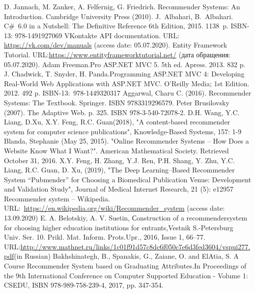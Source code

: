 \documentclass[conference]{IEEEtran}
\begin{document}
\begin{thebibliography}{99}
 D. Jannach, M. Zanker, A. Felfernig, G. Friedrich. Recommender Systems: An Introduction. Cambridge University Press (2010).
 J.~Albahari, B.~Albahari. C\#~6.0 in a Nutshell: The Definitive Reference 6th Edition, 2015. 1138~p. ISBN-13: 978-1491927069
VKontakte API documentation. URL: \url{https://vk.com/dev/manuals} (access date: 05.07.2020).
Entity Framework Tutorial. URL:\url{https://www.entityframeworktutorial.net/} (дата обращения: 05.07.2020).
Adam Freeman.Pro ASP.NET MVC 5. 5th ed. Apress. 2013. 832 p. 
 J. Chadwick, T. Snyder, H. Panda.Programming ASP.NET MVC 4: Developing Real-World Web Applications with ASP.NET MVC.  O'Reilly Media; 1st Edition. 2012. 492 p.  ISBN-13:~978-1449320317
Aggarwal, Charu C. (2016). Recommender Systems: The Textbook. Springer. ISBN 9783319296579.
Peter Brusilovsky (2007). The Adaptive Web. p. 325. ISBN 978-3-540-72078-2.
D.H. Wang, Y.C. Liang, D.Xu, X.Y. Feng, R.C. Guan(2018), "A content-based recommender system for computer science publications", Knowledge-Based Systems, 157: 1-9
Blanda, Stephanie (May 25, 2015). "Online Recommender Systems – How Does a Website Know What I Want?". American Mathematical Society. Retrieved October 31, 2016.
X.Y. Feng, H. Zhang, Y.J. Ren, P.H. Shang, Y. Zhu, Y.C. Liang, R.C. Guan, D. Xu, (2019), "The Deep Learning–Based Recommender System “Pubmender” for Choosing a Biomedical Publication Venue: Development and Validation Study", Journal of Medical Internet Research, 21 (5): e12957
Recommender system -- Wikipedia. URL:~\url{https://en.wikipedia.org/wiki/Recommender_system} (access date: 13.09.2020)
 E. A. Belotskiy, A. V. Suetin, Сonstruction of a recommendersystem for choosing higher education institutions for entrants,Vestnik S.-Petersburg Univ. Ser. 10. Prikl. Mat. Inform. Prots.Upr., 2016, Issue 1, 66–77. URL:\url{http://www.mathnet.ru/links/1c01f91d57c8dc6f050c7e6d3fed3604/vspui277.pdf}(in Russian)
Bakhshinategh, B., Spanakis, G., Zaiane, O. and ElAtia, S. A Course Recommender System based on Graduating Attributes.In Proceedings of the 9th International Conference on Computer Supported Education - Volume 1: CSEDU, ISBN 978-989-758-239-4, 2017, pp. 347-354. 

\end{thebibliography}
\end{document}
